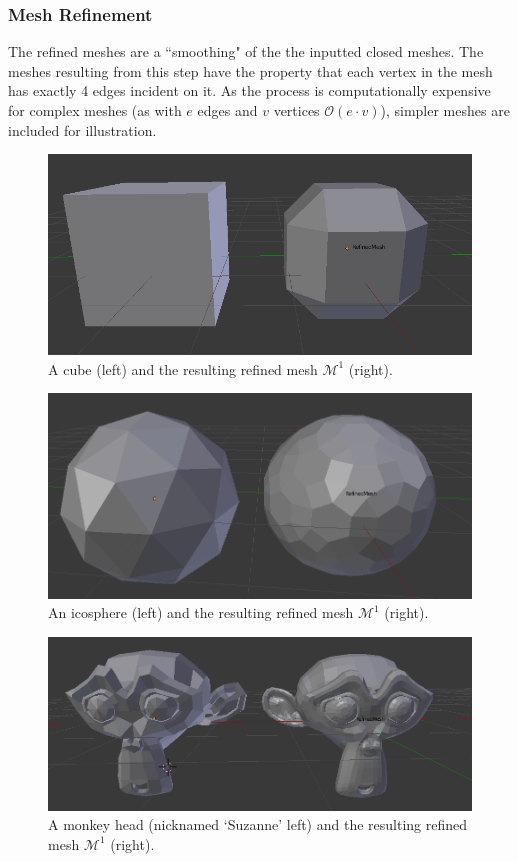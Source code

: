 \documentclass[11pt]{article}
\begin{document}
	\subsubsection*{Mesh Refinement}
	The refined meshes are a ``smoothing" of the the inputted closed meshes. The meshes resulting from this step have the property that each vertex in the mesh has exactly 4 edges incident on it. As the process is computationally expensive for complex meshes (as with $e$ edges and $v$ vertices  $\mathcal{O}(e\cdot v)$), simpler meshes are included for illustration.	
	\begin{figure}
			\centering
			\captionsetup{justification=centering}
			\includegraphics[width=.7\linewidth]{img/refine_cube}
			\caption{A cube (left) and the resulting refined mesh $\mathcal{M}^1$ (right).}
	\end{figure}	
	\begin{figure}
		\centering
		\captionsetup{justification=centering}
		\includegraphics[width=.7\linewidth]{img/refine_icosphere}
		\caption{An icosphere (left) and the resulting refined mesh $\mathcal{M}^1$ (right).}		
	\end{figure}
	\begin{figure}
		\centering
		\captionsetup{justification=centering}
		\includegraphics[width=.7\linewidth]{img/refine_monkey}
		\caption{A monkey head (nicknamed `Suzanne' left) and the resulting refined mesh $\mathcal{M}^1$ (right).}			
	\end{figure}
\end{document}
